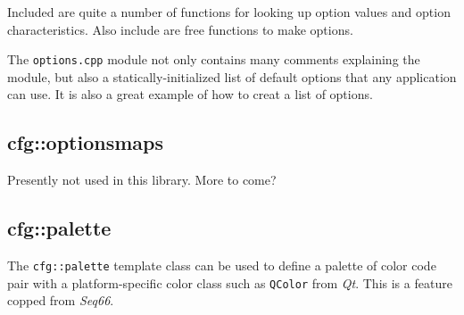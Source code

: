    Included are quite a number of functions for looking up option values
   and option characteristics.
   Also include are free functions to make options.

   The \texttt{options.cpp} module not only contains many comments explaining
   the module, but also a statically-initialized list of
   default options that any application can use.
   It is also a great example of how to creat a list of options.

\subsection{cfg::optionsmaps}
\label{subsec:cfg_namespace_optionsmaps}

   Presently not used in this library. More to come?

\subsection{cfg::palette}
\label{subsec:cfg_namespace_}

   The \texttt{cfg::palette} template class can be used to define
   a palette of color code pair with a platform-specific color class
   such as \texttt{QColor} from \textsl{Qt}.
   This is a feature copped from \textsl{Seq66}.

